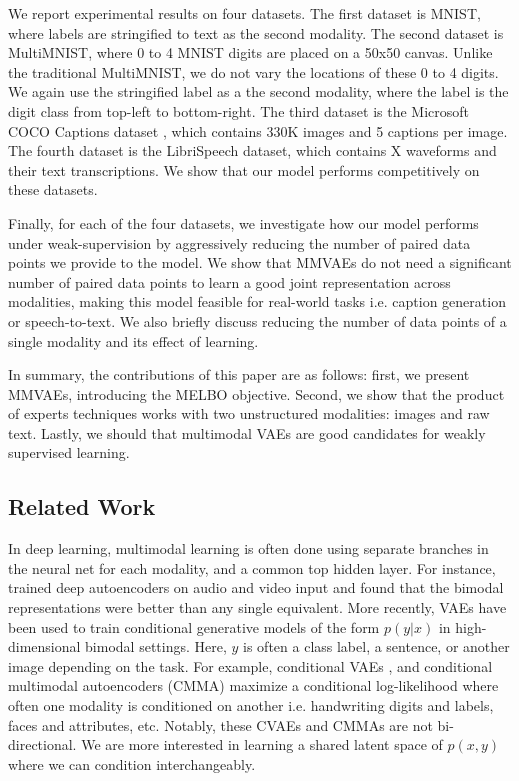 \documentclass{article}
\begin{document}
We report experimental results on four datasets. The first dataset is MNIST, where labels are stringified to text as the second modality. The second dataset is MultiMNIST, where 0 to 4 MNIST digits are placed on a 50x50 canvas. Unlike the traditional MultiMNIST, we do not vary the locations of these 0 to 4 digits. We again use the stringified label as a the second modality, where the label is the digit class from top-left to bottom-right. The third dataset is the Microsoft COCO Captions dataset \cite{chen2015microsoft}, which contains 330K images and 5 captions per image. The fourth dataset is the LibriSpeech dataset, which contains X waveforms and their text transcriptions. We show that our model performs competitively on these datasets.

Finally, for each of the four datasets, we investigate how our model performs under weak-supervision by aggressively reducing the number of paired data points we provide to the model. We show that MMVAEs do not need a significant number of paired data points to learn a good joint representation across modalities, making this model feasible for real-world tasks i.e. caption generation or speech-to-text. We also briefly discuss reducing the number of data points of a single modality and its effect of learning.

In summary, the contributions of this paper are as follows: first, we present MMVAEs, introducing the MELBO objective. Second, we show that the product of experts techniques works with two unstructured modalities: images and raw text. Lastly, we should that multimodal VAEs are good candidates for weakly supervised learning.

\subsection{Related Work}
In deep learning, multimodal learning is often done using separate branches in the neural net for each modality, and a common top hidden layer. For instance, \citet{ngiam2011multimodal} trained deep autoencoders on audio and video input and found that the bimodal representations were better than any single equivalent. More recently, VAEs \cite{kingma2013auto, kingma2014semi} have been used to train conditional generative models of the form $p(y | x)$ in high-dimensional bimodal settings. Here, $y$ is often a class label, a sentence, or another image depending on the task. For example, conditional VAEs \cite{sohn2015learning}, and conditional multimodal autoencoders (CMMA) \cite{pandey2017variational} maximize a conditional log-likelihood where often one modality is conditioned on another i.e. handwriting digits and labels, faces and attributes, etc. Notably, these CVAEs and CMMAs are not bi-directional. We are more interested in learning a shared latent space of $p(x, y)$ where we can condition interchangeably. 
\end{document}
